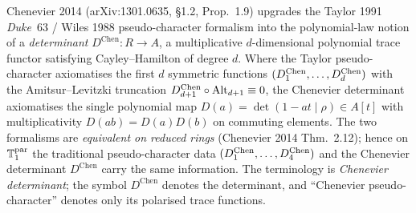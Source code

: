 \begin{remark}
\label{rem:dl-chenevier-determinant-vs-pseudocharacter}
Chenevier 2014 (arXiv:1301.0635, \S1.2, Prop.~1.9) upgrades the Taylor
1991 \emph{Duke}~63 / Wiles 1988 pseudo-character formalism into the
polynomial-law notion of a \emph{determinant}
$D^{\mathrm{Chen}}\colon R\to A$, a multiplicative $d$-dimensional
polynomial trace functor satisfying Cayley--Hamilton of degree $d$.
Where the Taylor pseudo-character axiomatises the first $d$
symmetric functions $(D^{\mathrm{Chen}}_1,\dots,D^{\mathrm{Chen}}_d)$ with the
Amitsur--Levitzki truncation $D^{\mathrm{Chen}}_{d+1}\circ\mathrm{Alt}_{d+1}\equiv 0$,
the Chenevier determinant axiomatises the single polynomial map
$D(a) = \det(1-at\mid\rho)\in A[t]$ with multiplicativity
$D(ab) = D(a)D(b)$ on commuting elements. The two formalisms are
\emph{equivalent on reduced rings} (Chenevier 2014 Thm.~2.12); hence
on $\mathbb{T}^{\mathrm{par}}_1$ the traditional pseudo-character data
$(D^{\mathrm{Chen}}_1,\dots,D^{\mathrm{Chen}}_4)$ and the Chenevier determinant
$D^{\mathrm{Chen}}$ carry the same information. The terminology is
\emph{Chenevier determinant}; the symbol $D^{\mathrm{Chen}}$ denotes
the determinant, and ``Chenevier pseudo-character'' denotes only its
polarised trace functions.
\end{remark}

